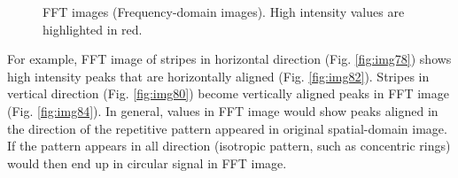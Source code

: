 \begin{figure}[htbp]
 \centering
 \caption{ FFT images (Frequency-domain images). High intensity values are highlighted in red.}
 \label{fig:FFTtransformedStripesDirections}
\end{figure} 


For example, FFT image of stripes in horizontal direction (Fig. \ref{fig:img78}) shows high intensity peaks that are horizontally aligned (Fig. \ref{fig:img82}). 
Stripes in vertical direction (Fig. \ref{fig:img80}) become vertically
aligned peaks in FFT image (Fig. \ref{fig:img84}). 
In general, values in FFT image would show peaks aligned in the direction of the repetitive pattern appeared in original spatial-domain image. If the pattern appears in all direction (isotropic pattern, such as concentric rings) would then end up in circular signal in FFT image. 

